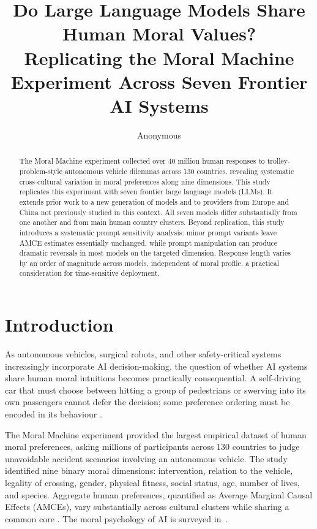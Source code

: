 \documentclass[letterpaper]{article}
\title{Do Large Language Models Share Human Moral Values?\\
Replicating the Moral Machine Experiment Across Seven Frontier AI Systems}
\author{Anonymous}
\begin{document}
\maketitle

\begin{abstract}
The Moral Machine experiment collected over 40 million human responses to
trolley-problem-style autonomous vehicle dilemmas across 130 countries, revealing
systematic cross-cultural variation in moral preferences along nine dimensions.
This study replicates this experiment with seven frontier large language models
(LLMs). It extends prior work to a new generation of models and to providers from
Europe and China not previously studied in this context. All seven models differ
substantially from one another and from main human country clusters. Beyond
replication, this study introduces a systematic prompt sensitivity analysis: minor
prompt variants leave AMCE estimates essentially unchanged, while prompt
manipulation can produce dramatic reversals in most models on the targeted
dimension. Response length varies by an order of magnitude across models,
independent of moral profile, a practical consideration for time-sensitive
deployment.
\end{abstract}

\section{Introduction}

As autonomous vehicles, surgical robots, and other safety-critical systems
increasingly incorporate AI decision-making, the question of whether AI systems
share human moral intuitions becomes practically consequential. A self-driving car
that must choose between hitting a group of pedestrians or swerving into its own
passengers cannot defer the decision; some preference ordering must be encoded in
its behaviour \citep{bonnefon2016}.

The Moral Machine experiment \citep{awad2018} provided the largest empirical
dataset of human moral preferences, asking millions of participants across 130
countries to judge unavoidable accident scenarios involving an autonomous vehicle.
The study identified nine binary moral dimensions: intervention, relation to the
vehicle, legality of crossing, gender, physical fitness, social status, age, number
of lives, and species. Aggregate human preferences, quantified as Average Marginal
Causal Effects (AMCEs), vary substantially across cultural clusters while sharing a
common core \citep{awad2020a}. The moral psychology of AI is surveyed
in~\citet{bonnefon2024}.
\end{document}
